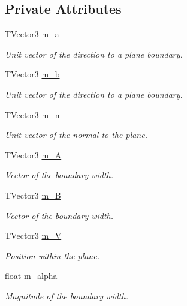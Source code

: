 \subsection*{Private Attributes}
\begin{DoxyCompactItemize}
\item 
T\-Vector3 \hyperlink{classcalib_1_1Plane_ab12bd9c7c096da927339d3d17004d9d3}{m\-\_\-a}
\begin{DoxyCompactList}\small\item\em Unit vector of the direction to a plane boundary. \end{DoxyCompactList}\item 
T\-Vector3 \hyperlink{classcalib_1_1Plane_a848054d2fc3233d28b439d579bab9fd5}{m\-\_\-b}
\begin{DoxyCompactList}\small\item\em Unit vector of the direction to a plane boundary. \end{DoxyCompactList}\item 
T\-Vector3 \hyperlink{classcalib_1_1Plane_ab34583a66659f2621203b77305f2da15}{m\-\_\-n}
\begin{DoxyCompactList}\small\item\em Unit vector of the normal to the plane. \end{DoxyCompactList}\item 
T\-Vector3 \hyperlink{classcalib_1_1Plane_afb72762fc0bb5e4e9a5e19f0c9f73e33}{m\-\_\-\-A}
\begin{DoxyCompactList}\small\item\em Vector of the boundary width. \end{DoxyCompactList}\item 
T\-Vector3 \hyperlink{classcalib_1_1Plane_a30876b03ceb26caffaab1ebc34892b36}{m\-\_\-\-B}
\begin{DoxyCompactList}\small\item\em Vector of the boundary width. \end{DoxyCompactList}\item 
T\-Vector3 \hyperlink{classcalib_1_1Plane_ab1095167213eea938897a1ba91a6ddfb}{m\-\_\-\-V}
\begin{DoxyCompactList}\small\item\em Position within the plane. \end{DoxyCompactList}\item 
float \hyperlink{classcalib_1_1Plane_a6a08d6b346557d6e889c4fda0099bd43}{m\-\_\-alpha}
\begin{DoxyCompactList}\small\item\em Magnitude of the boundary width. \end{DoxyCompactList}\item 

\end{DoxyCompactItemize}
